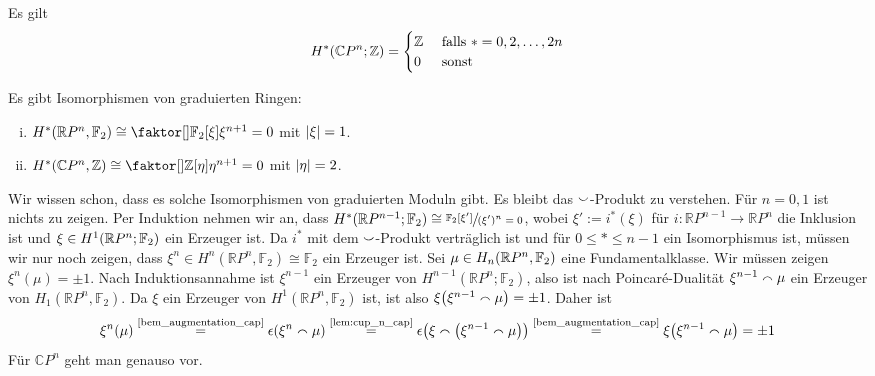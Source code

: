\begin{beispiel}[{name=[Kohomologie des komplex projektiven Raumes]}]
	Es gilt
	\[
		H^* \enbrace*{\mathbb{C}P^n;\mathbb{Z}} = \begin{cases}
			\mathbb{Z} &\text{ falls }*=0,2,\ldots ,2n\\
			0 &\text{ sonst}
		\end{cases}
	\]
\end{beispiel}

\begin{satz}[{name=[Ringstruktur der Kohomologie für die projektiven Räume]},label=satz:kohomo_ring_projektiv]
	Es gibt Isomorphismen von graduierten Ringen: 
	\begin{enumerate}[(i)]
		\item $H^* \enbrace*{\mathbb{R}P^n,\mathbb{F}_2} \cong \Faktor{\mathbb{F}_2[\xi]}{\xi^{n+1}=0}$ mit $\abs*{\xi}=1$.
		\item $H^* \enbrace*{\mathbb{C}P^n,\mathbb{Z}} \cong \Faktor{\mathbb{Z}[\eta]}{\eta^{n+1}=0}$ mit $\abs{\eta}=2$.
	\end{enumerate}
\end{satz}
\begin{beweis}
	Wir wissen schon, dass es solche Isomorphismen von graduierten Moduln gibt. 
	Es bleibt das $\cupp$-Produkt zu verstehen. Für $n=0,1$ ist nichts zu zeigen. 
	Per Induktion nehmen wir an, dass $H^*(\mathbb{R}P^{n-1};\mathbb{F}_2) \cong \sfrac{\mathbb{F}_2[\xi']}{(\xi')^n=0}$, wobei $\xi' := i^*(\xi)$ für $i \colon \mathbb{R}P^{n-1} \to \mathbb{R}P^n$ die Inklusion ist und $\xi \in H^1 \enbrace*{\mathbb{R}P^n;\mathbb{F}_2}$ ein Erzeuger ist.
	Da $i^*$ mit dem $\cupp$-Produkt verträglich ist und für $0 \le * \le {n-1}$ ein Isomorphismus ist, müssen wir nur noch zeigen, dass $\xi^n\in H^n(\mathbb{R}P^n,\mathbb{F}_2) \cong \mathbb{F}_2$ ein Erzeuger ist.
	Sei $\mu \in H_n \enbrace*{\mathbb{R}P^n,\mathbb{F}_2}$ eine Fundamentalklasse. Wir müssen zeigen $\xi^n(\mu)=  \pm 1$.
	Nach Induktionsannahme ist $\xi^{n-1}$ ein Erzeuger von $H^{n-1}(\mathbb{R}P^n;\mathbb{F}_2)$, also ist nach Poincaré-Dualität $\xi^{n-1} \capp \mu$ ein Erzeuger von $H_1(\mathbb{R}P^n,\mathbb{F}_2)$. 
	Da $\xi$ ein Erzeuger von $H^1(\mathbb{R}P^n,\mathbb{F}_2)$ ist, ist also $\xi \enbrace*{\xi^{n-1} \capp \mu} = \pm 1$. 
	Daher ist 
	\[
		\xi^n(\mu) \StackText{\ref{bem_augmentation_cap}}{=} \epsilon \enbrace*{\xi^n \capp \mu} \StackText{\ref{lem:cup_n_cap}}{=} \epsilon \enbrace*{ \xi \capp \enbrace*{\xi^{n-1} \capp \mu}} \StackText{\ref{bem_augmentation_cap}}{=} \xi \enbrace*{\xi^{n-1} \capp \mu} = \pm 1
	\]
	Für $\mathbb{C}P^n$ geht man genauso vor.
\end{beweis}

